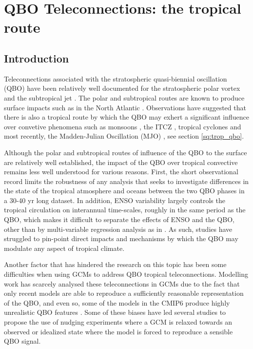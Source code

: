\chapter{\label{ch:7-qbo} QBO Teleconnections: the tropical route }

\section{Introduction}


Teleconnections associated with the stratospheric quasi-biennial oscillation (QBO) have been relatively well documented for the stratospheric polar vortex \citep{holton1980,lu2020} and the subtropical jet \citep{garfinkel2011}. The polar and subtropical routes are known to produce surface impacts such as in the North Atlantic \citep{gray2018,andrews2019observed}. 
 Observations have suggested that there is also a tropical route by which the QBO may exhert a significant influence over convetive phenomena such as monsoons \citep{giorgetta1999,liess2012}, the ITCZ \citep{gray2018}, tropical cyclones \citep{gray1984,chan1995} and most recently, the Madden-Julian Oscillation (MJO) \citep{lee2018,wang2019,martin2020jgr}, see section \ref{sq:trop_qbo}. 
 
 Although the polar and subtropical routes of influence of the QBO to the surface are relatively well established, the impact of the QBO over tropical convective remains less well understood for various reasons. First, the short observational record limits the robustness of any analysis that seeks to investigate differences in the state of the tropical atmosphere and oceans between the two QBO phases in a 30-40 yr long dataset. In addition, ENSO variability largely controls the tropical circulation on interannual time-scales, roughly in the same period as the QBO, which makes it difficult to separate the effects of ENSO and the QBO, other than by multi-variable regression analysis as in \cite{gray2018}. As such, studies have struggled to pin-point direct impacts and mechanisms by which the QBO may modulate any aspect of tropical climate. 

Another factor that has hindered the research on this topic has been some difficulties when using GCMs to address QBO tropical teleconnections. 
Modelling work has scarcely analysed these teleconnections in GCMs due to the fact that only recent models are able to reproduce a sufficiently reasonable representation of the QBO, and even so, some of the models in the CMIP6 produce highly unrealistic QBO features \citep{richter2020}. Some of these biases have led several studies to propose the use of nudging experiments where a GCM is relaxed towards an observed or idealized state where the model is forced to reproduce a sensible QBO signal. 


